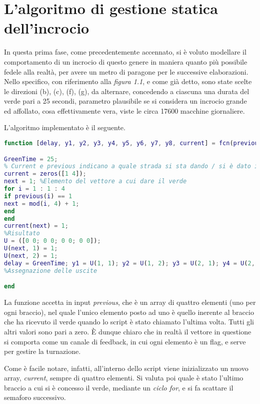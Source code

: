 \newpage
\section{L'algoritmo di gestione statica dell'incrocio} \label{section: AlgoritmoStatico}
In questa prima fase, come precedentemente accennato, si è voluto modellare il comportamento di un incrocio di questo genere in maniera quanto più possibile fedele alla realtà, per avere un metro di paragone per le successive elaborazioni. Nello specifico, con riferimento alla \textit{figura 1.1}, e come già detto, sono state scelte le direzioni (b), (c), (f), (g), da alternare, concedendo a ciascuna una durata del verde pari a 25 secondi, parametro plausibile se si considera un incrocio grande ed affollato, cosa effettivamente vera, viste le circa 17600 macchine giornaliere.

L’algoritmo implementato è il seguente.

\begin{lstlisting}[language=Matlab,label=static-algorithm,caption= Algoritmo di gestione statica del singolo incrocio]
function [delay, y1, y2, y3, y4, y5, y6, y7, y8, current] = fcn(previous)

GreenTime = 25;
% Current e previous indicano a quale strada si sta dando / si è dato il verde 
current = zeros([1 4]);
next = 1; %Elemento del vettore a cui dare il verde
for i = 1 : 1 : 4
if previous(i) == 1
next = mod(i, 4) + 1;
end
end
current(next) = 1;
%Risultato
U = ([0 0; 0 0; 0 0; 0 0]);
U(next, 1) = 1;
U(next, 2) = 1;
delay = GreenTime; y1 = U(1, 1); y2 = U(1, 2); y3 = U(2, 1); y4 = U(2, 2); y5 = U(3, 1); y6 = U(3, 2); y7 = U(4, 1); y8 = U(4, 2);
%Assegnazione delle uscite

end
\end{lstlisting}
\newpage
La funzione accetta in input \textit{previous}, che è un array di quattro elementi (uno per ogni braccio), nel quale l’unico elemento posto ad uno è quello inerente al braccio che ha ricevuto il verde quando lo script è stato chiamato l’ultima volta. Tutti gli altri valori sono pari a zero. È dunque chiaro che in realtà il vettore in questione si comporta come un canale di feedback, in cui ogni elemento è un flag, e serve per gestire la turnazione.

Come è facile notare, infatti, all’interno dello script viene inizializzato un nuovo array, \textit{current}, sempre di quattro elementi. Si valuta poi quale è stato l’ultimo braccio a cui si è concesso il verde, mediante un \textit{ciclo for}, e si fa scattare il semaforo successivo.

